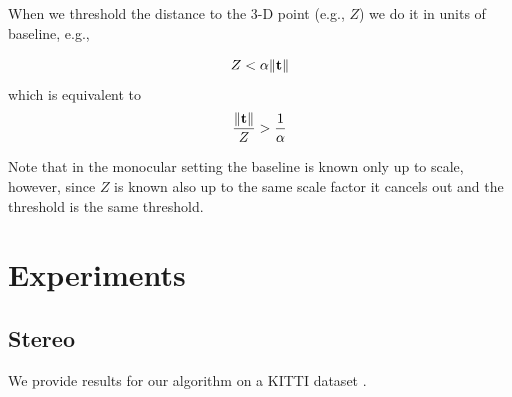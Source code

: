 \documentclass{bmvc2k}
\DeclarePairedDelimiter{\norm}{\lVert}{\rVert}
\begin{document}
When we threshold the distance to the 3-D point (e.g., $Z$) we do it
in units of baseline, e.g.,

\begin{equation}
Z<\alpha \norm{ \mathbf{t} }
\end{equation}
which is equivalent to
\begin{equation}
\frac{\norm{\mathbf{t}}}{Z} > \frac{1}{\alpha}
\end{equation}

Note that in the monocular setting the baseline is known only up to scale, however, since $Z$ is known also up to the same scale factor it cancels out and the threshold is the same threshold.

\section{Experiments}

\subsection{Stereo}
We provide results for our algorithm on a KITTI dataset
\cite{Geiger2012}.


\end{document}
